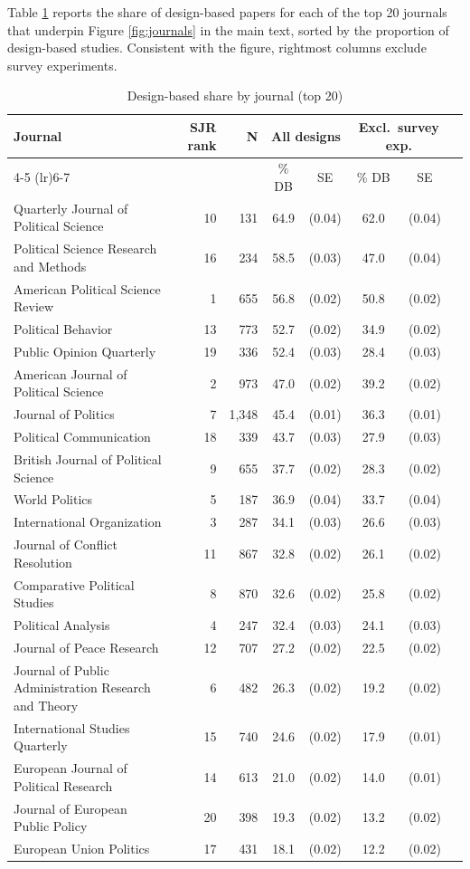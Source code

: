 \documentclass[12pt]{article}
\begin{document}
Table \ref{tab:byjournal} reports the share of design-based papers for each of the top 20 journals that underpin Figure \ref{fig:journals} in the main text, sorted by the proportion of design-based studies. Consistent with the figure, rightmost columns exclude survey experiments.

\begin{table}[htbp]
\centering
\caption{Design-based share by journal (top 20)}
\label{tab:byjournal}
\begin{tiny}
\begin{tabular}{@{}lrrccccc@{}}
\toprule
Journal & SJR rank & N & \multicolumn{2}{c}{All designs} & \multicolumn{2}{c}{Excl.\ survey exp.} \\
\cmidrule(lr){4-5} \cmidrule(lr){6-7}
 & & & \% DB & SE & \% DB & SE \\
\midrule
Quarterly Journal of Political Science & 10 & 131 & 64.9 & (0.04) & 62.0 & (0.04) \\
Political Science Research and Methods & 16 & 234 & 58.5 & (0.03) & 47.0 & (0.04) \\
American Political Science Review & 1 & 655 & 56.8 & (0.02) & 50.8 & (0.02) \\
Political Behavior & 13 & 773 & 52.7 & (0.02) & 34.9 & (0.02) \\
Public Opinion Quarterly & 19 & 336 & 52.4 & (0.03) & 28.4 & (0.03) \\
American Journal of Political Science & 2 & 973 & 47.0 & (0.02) & 39.2 & (0.02) \\
Journal of Politics & 7 & 1,348 & 45.4 & (0.01) & 36.3 & (0.01) \\
Political Communication & 18 & 339 & 43.7 & (0.03) & 27.9 & (0.03) \\
British Journal of Political Science & 9 & 655 & 37.7 & (0.02) & 28.3 & (0.02) \\
World Politics & 5 & 187 & 36.9 & (0.04) & 33.7 & (0.04) \\
International Organization & 3 & 287 & 34.1 & (0.03) & 26.6 & (0.03) \\
Journal of Conflict Resolution & 11 & 867 & 32.8 & (0.02) & 26.1 & (0.02) \\
Comparative Political Studies & 8 & 870 & 32.6 & (0.02) & 25.8 & (0.02) \\
Political Analysis & 4 & 247 & 32.4 & (0.03) & 24.1 & (0.03) \\
Journal of Peace Research & 12 & 707 & 27.2 & (0.02) & 22.5 & (0.02) \\
Journal of Public Administration Research and Theory & 6 & 482 & 26.3 & (0.02) & 19.2 & (0.02) \\
International Studies Quarterly & 15 & 740 & 24.6 & (0.02) & 17.9 & (0.01) \\
European Journal of Political Research & 14 & 613 & 21.0 & (0.02) & 14.0 & (0.01) \\
Journal of European Public Policy & 20 & 398 & 19.3 & (0.02) & 13.2 & (0.02) \\
European Union Politics & 17 & 431 & 18.1 & (0.02) & 12.2 & (0.02) \\
\bottomrule
\end{tabular}
\end{tiny}
\end{table}
\end{document}
